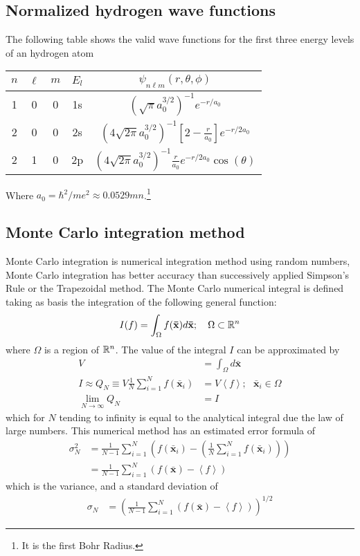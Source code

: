 \documentclass{aa}%
\begin{document}
\subsection{Normalized hydrogen wave functions}
The following table shows the valid wave functions for the first three energy levels of an hydrogen atom
\begin{center}
	\def\arraystretch{2.5}
	\begin{tabular}{ccc|c|c}
		\hline
		\hline
		$n$ & $\ell$ & $m$ & $E_l$ & $\psi_{n\ell m}(r,\theta,\phi)$ \\
		\hline
		\hline
		1   & 0      & 0   & 1s & $\left( \sqrt{\pi}a_0^{3/2} \right)^{-1} e^{-r/a_0} $\\
		2   & 0      & 0   & 2s & $\left( 4\sqrt{2\pi}a_0^{3/2} \right)^{-1} \left[ 2 - \frac{r}{a_0} \right] e^{-r/2a_0}$\\
		2   & 1      & 0   & 2p & $\left( 4\sqrt{2\pi}a_0^{3/2} \right)^{-1} \frac{r}{a_0} e^{-r/2a_0} \cos(\theta)$\\
	 	\hline
		\hline
	\end{tabular}
\end{center}
Where $a_0 = \hbar^2/me^2 \approx 0.0529mn$.\cite{hydrofunctions}\footnote{It is the first Bohr Radius.}

\subsection{Monte Carlo integration method}
Monte Carlo integration is numerical integration method using random numbers, Monte Carlo integration has better accuracy than successively applied Simpson's Rule or the Trapezoidal method. The Monte Carlo numerical integral is defined taking as basis the integration of the following general function:
\begin{gather}
	I(f) = \int_{\Omega} f(\mathbf{\bar{x}}) d\mathbf{\bar{x}};~~~\Omega\subset\mathbb{R}^n
\end{gather}
where $\Omega$ is a region of $\mathbb{R}^n$. The value of the integral $I$ can be approximated by
\begin{align}
	V &= \int_{\Omega} d\mathbf{\bar{x}}\\
	I \approx Q_N \equiv V \frac{1}{N} \sum_{i=1}^{N}f(\mathbf{\bar{x}}_i) &= V\left\langle f \right\rangle;~~~\mathbf{\bar{x}}_i\in\Omega\\
	\lim\limits_{N\to\infty} Q_N &= I
\end{align}
which for $N$ tending to infinity is equal to the analytical integral due the law of large numbers. This numerical method has an estimated error formula of
\begin{align}
	\sigma_N^2 &= \frac{1}{N-1} \sum_{i=1}^{N} \left( f(\mathbf{\bar{x}}_i) - \left( \frac{1}{N} \sum_{i=1}^{N}f(\mathbf{\bar{x}}_i) \right) \right)\\
	&= \frac{1}{N-1} \sum_{i=1}^{N} \left( f(\mathbf{\bar{x}}) - \left\langle f \right\rangle \right)
\end{align}
which is the variance, and a standard deviation of
\begin{align}
	\sigma_N &= \left( \frac{1}{N-1} \sum_{i=1}^{N} \left( f(\mathbf{\bar{x}}) - \left\langle f \right\rangle \right) \right)^{1/2}
\end{align}
\end{document}
